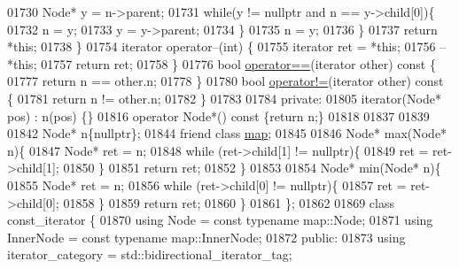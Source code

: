 \begin{DoxyCode}
01730                 Node* y = n->parent;
01731                 \textcolor{keywordflow}{while}(y != \textcolor{keyword}{nullptr} and n == y->child[0])\{
01732                     n = y;
01733                     y = y->parent;
01734                 \}
01735                 n = y;
01736             \}
01737             \textcolor{keywordflow}{return} *\textcolor{keyword}{this};
01738         \}
01754         iterator operator--(\textcolor{keywordtype}{int}) \{
01755             iterator ret = *\textcolor{keyword}{this};
01756             --*\textcolor{keyword}{this};
01757             \textcolor{keywordflow}{return} ret;
01758         \}
01776         \textcolor{keywordtype}{bool} \hyperlink{classaed2_1_1map_abfc51b39670220e79037ac067006e933_abfc51b39670220e79037ac067006e933}{operator==}(iterator other)\textcolor{keyword}{ const }\{
01777             \textcolor{keywordflow}{return} n == other.n;
01778         \}
01780         \textcolor{keywordtype}{bool} \hyperlink{classaed2_1_1map_abce0fa35c5b25fd67111c2e704616f09_abce0fa35c5b25fd67111c2e704616f09}{operator!=}(iterator other)\textcolor{keyword}{ const }\{
01781             \textcolor{keywordflow}{return} n != other.n;
01782         \}
01783 
01784     \textcolor{keyword}{private}:
01805         iterator(Node* pos) : n(pos) \{\}
01816         \textcolor{keyword}{operator} Node*() \textcolor{keyword}{const} \{\textcolor{keywordflow}{return} n;\}
01818 
01837 
01839 
01842         Node* n\{\textcolor{keyword}{nullptr}\};
01844         \textcolor{keyword}{friend} \textcolor{keyword}{class }\hyperlink{classaed2_1_1map}{map};
01845 
01846         Node* max(Node* n)\{
01847             Node* ret = n;
01848             \textcolor{keywordflow}{while} (ret->child[1] != \textcolor{keyword}{nullptr})\{
01849                 ret = ret->child[1];
01850             \}
01851             \textcolor{keywordflow}{return} ret;
01852         \}
01853 
01854        Node* min(Node* n)\{
01855            Node* ret = n;
01856            \textcolor{keywordflow}{while} (ret->child[0] != \textcolor{keyword}{nullptr})\{
01857                 ret = ret->child[0];
01858            \}
01859            \textcolor{keywordflow}{return} ret;
01860         \}
01861     \};
01862 
01869     \textcolor{keyword}{class }const\_iterator \{
01870         \textcolor{keyword}{using} Node = \textcolor{keyword}{const} \textcolor{keyword}{typename} map::Node;
01871         \textcolor{keyword}{using} InnerNode = \textcolor{keyword}{const} \textcolor{keyword}{typename} map::InnerNode;
01872     \textcolor{keyword}{public}:
01873         \textcolor{keyword}{using} iterator\_category = std::bidirectional\_iterator\_tag;

\end{DoxyCode}
